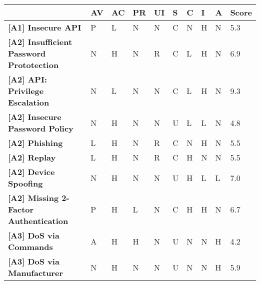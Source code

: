 \begin{sidewaystable}
\centering
\sffamily
\begin{tabularx}{\textwidth}{|l|X|X|X|X|X|X|X|X|l|}
\hline
                                                     & \textbf{AV} & \textbf{AC} & \textbf{PR} & \textbf{UI} & \textbf{S} & \textbf{C} & \textbf{I} & \textbf{A} & \textbf{Score} \\ \hline
\textbf{{[}A1{]} Insecure API}                       & P           & L           & N           & N           & C          & N          & H          & N          & 5.3            \\ \hline
\textbf{{[}A2{]} Insufficient Password Prototection} & N           & H           & N           & R           & C          & L          & H          & N          & 6.9            \\ \hline
\textbf{{[}A2{]} API: Privilege Escalation}          & N           & L           & N           & N           & C          & L          & H          & N          & 9.3            \\ \hline
\textbf{{[}A2{]} Insecure Password Policy}           & N           & H           & N           & N           & U          & L          & L          & N          & 4.8            \\ \hline
\textbf{{[}A2{]} Phishing}                           & L           & H           & N           & R           & C          & N          & H          & N          & 5.5            \\ \hline
\textbf{{[}A2{]} Replay}                             & L           & H           & N           & R           & C          & H          & N          & N          & 5.5            \\ \hline
\textbf{{[}A2{]} Device Spoofing}                    & N           & H           & N           & N           & U          & H          & L          & L          & 7.0            \\ \hline
\textbf{{[}A2{]} Missing 2-Factor Authentication}    & P           & H           & L           & N           & C          & H          & H          & N          & 6.7            \\ \hline
\textbf{{[}A3{]} DoS via Commands}                   & A           & H           & H           & N           & U          & N          & N          & H          & 4.2            \\ \hline
\textbf{{[}A3{]} DoS via Manufacturer}               & N           & H           & N           & N           & U          & N          & N          & H          & 5.9            \\ \hline

\end{tabularx}
\end{sidewaystable}
